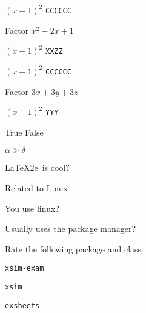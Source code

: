 \documentclass{article}
\begin{document}
    \begin{scontents}[store-env=simplews]
    $\left(x-1\right)^{2}$ \verb+CCCCCC+
    \end{scontents}


\begin{enumext}[save-ans=simplews,columns=2,align=plop,check-ans=true,show-ans=true,nosep,save-ref=true,wrap-label={\tikz[scale=0.25]\duck[signpost=\scalebox{0.6}{#1}];}]
  \item Factor $x^{2}-2x+1$
    \begin{anskey*}
    $\left(x-1\right)^{2}$ \verb+XXZZ+
    \end{anskey*}

            \begin{scontents}[store-env=simple,print-env=true]
          $\left(x-1\right)^{2}$ \verb+CCCCCC+
        \end{scontents}

  \item Factor $3x+3y+3z$
    \begin{anskey*}
    $\left(x-1\right)^{2}$ \verb+YYY+
    \end{anskey*}
  \item True False
    \begin{enumext}[nosep]
      \item $\alpha > \delta$ 
      \item \LaTeX2e\ is cool? 
    \end{enumext}
  \item Related to Linux
    \begin{enumext}[nosep]
      \item You use linux? 
      \item Usually uses the package manager? 
      \item Rate the following package and class
        \begin{enumext}[nosep]
          \item \texttt{xsim-exam} 
          \item \texttt{xsim} 
          \item \texttt{exsheets} 
        \end{enumext}
    \end{enumext}
\end{enumext}
\end{document}
